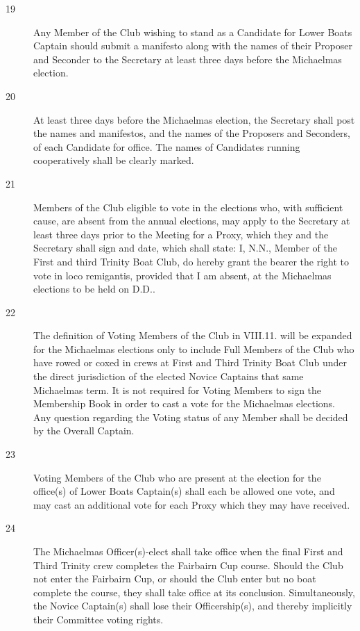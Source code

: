\documentclass{article}
\begin{document}
\begin{description}
\begin{description}
		\item[19] Any Member of the Club wishing to stand as a Candidate for Lower
		Boats Captain should submit a manifesto along with the names of their
		Proposer and Seconder to the Secretary at least three days before the
		Michaelmas election.\\
		
		\item[20] At least three days before the Michaelmas election, the Secretary shall
		post the names and manifestos, and the names of the Proposers and
		Seconders, of each Candidate for office. The names of Candidates
		running cooperatively shall be clearly marked.\\
		
		\item[21] Members of the Club eligible to vote in the elections who, with
		sufficient cause, are absent from the annual elections, may apply to the
		Secretary at least three days prior to the Meeting for a Proxy, which
		they and the Secretary shall sign and date, which shall state: I, N.N.,
		Member of the First and third Trinity Boat Club, do hereby grant the
		bearer the right to vote in loco remigantis, provided that I am absent, at
		the Michaelmas elections to be held on D.D..\\
		
		\item[22] The definition of Voting Members of the Club in VIII.11. will be
		expanded for the Michaelmas elections only to include Full Members
		of the Club who have rowed or coxed in crews at First and Third
		Trinity Boat Club under the direct jurisdiction of the elected Novice
		Captains that same Michaelmas term. It is not required for Voting
		Members to sign the Membership Book in order to cast a vote for the
		Michaelmas elections. Any question regarding the Voting status of any
		Member shall be decided by the Overall Captain.\\
		
		\item[23] Voting Members of the Club who are present at the election for the
		office(s) of Lower Boats Captain(s) shall each be allowed one vote,
		and may cast an additional vote for each Proxy which they may have
		received.\\
		
		\item[24] The Michaelmas Officer(s)-elect shall take office when the final First
		and Third Trinity crew completes the Fairbairn Cup course. Should the
		Club not enter the Fairbairn Cup, or should the Club enter but no boat
		complete the course, they shall take office at its conclusion.
		Simultaneously, the Novice Captain(s) shall lose their Officership(s),
		and thereby implicitly their Committee voting rights.\\
		

\end{description}
\end{description}
\end{document}
